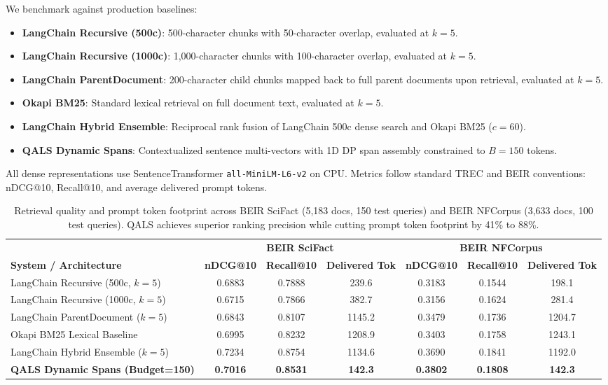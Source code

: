 \documentclass[preprint,12pt]{article}
\begin{document}
We benchmark against production baselines:
\begin{itemize}
    \item \textbf{LangChain Recursive (500c)}: 500-character chunks with 50-character overlap, evaluated at $k=5$.
    \item \textbf{LangChain Recursive (1000c)}: 1,000-character chunks with 100-character overlap, evaluated at $k=5$.
    \item \textbf{LangChain ParentDocument}: 200-character child chunks mapped back to full parent documents upon retrieval, evaluated at $k=5$.
    \item \textbf{Okapi BM25}: Standard lexical retrieval on full document text, evaluated at $k=5$.
    \item \textbf{LangChain Hybrid Ensemble}: Reciprocal rank fusion of LangChain 500c dense search and Okapi BM25 ($c=60$).
    \item \textbf{QALS Dynamic Spans}: Contextualized sentence multi-vectors with 1D DP span assembly constrained to $B=150$ tokens.
\end{itemize}
All dense representations use SentenceTransformer \texttt{all-MiniLM-L6-v2} on CPU. Metrics follow standard TREC and BEIR conventions: nDCG@10, Recall@10, and average delivered prompt tokens.

\begin{table}[t]
\centering
\caption{Retrieval quality and prompt token footprint across BEIR SciFact (5,183 docs, 150 test queries) and BEIR NFCorpus (3,633 docs, 100 test queries). QALS achieves superior ranking precision while cutting prompt token footprint by 41\% to 88\%.}
\label{tab:full_benchmark}
\small
\begin{tabular}{lcccccc}
\toprule
& \multicolumn{3}{c}{\textbf{BEIR SciFact}} & \multicolumn{3}{c}{\textbf{BEIR NFCorpus}} \\
\cmidrule(lr){2-4} \cmidrule(lr){5-7}
\textbf{System / Architecture} & \textbf{nDCG@10} & \textbf{Recall@10} & \textbf{Delivered Tok} & \textbf{nDCG@10} & \textbf{Recall@10} & \textbf{Delivered Tok} \\
\midrule
LangChain Recursive (500c, $k=5$) & 0.6883 & 0.7888 & 239.6 & 0.3183 & 0.1544 & 198.1 \\
LangChain Recursive (1000c, $k=5$) & 0.6715 & 0.7866 & 382.7 & 0.3156 & 0.1624 & 281.4 \\
LangChain ParentDocument ($k=5$) & 0.6843 & 0.8107 & 1145.2 & 0.3479 & 0.1736 & 1204.7 \\
Okapi BM25 Lexical Baseline & 0.6995 & 0.8232 & 1208.9 & 0.3403 & 0.1758 & 1243.1 \\
LangChain Hybrid Ensemble ($k=5$) & 0.7234 & 0.8754 & 1134.6 & 0.3690 & 0.1841 & 1192.0 \\
\midrule
\textbf{QALS Dynamic Spans (Budget=150)} & \textbf{0.7016} & \textbf{0.8531} & \textbf{142.3} & \textbf{0.3802} & \textbf{0.1808} & \textbf{142.3} \\
\bottomrule
\end{tabular}
\end{table}
\end{document}
